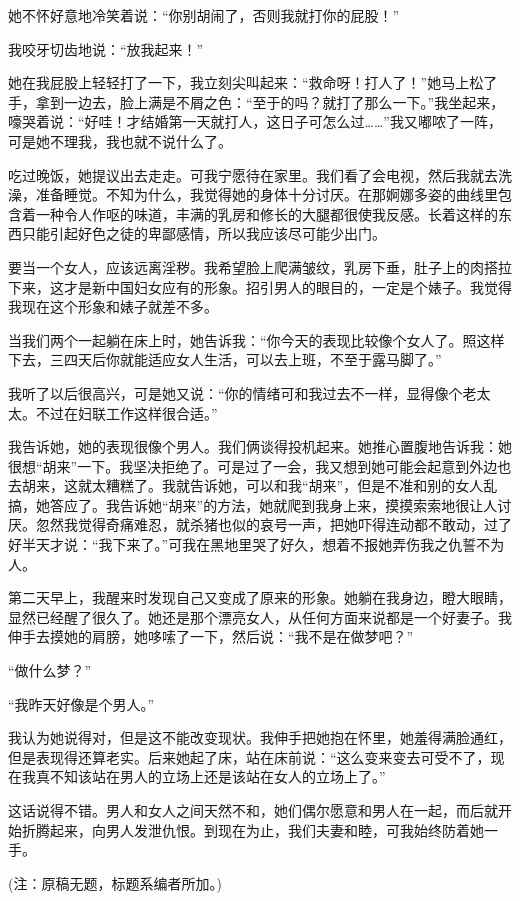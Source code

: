 她不怀好意地冷笑着说：“你别胡闹了，否则我就打你的屁股！” 

我咬牙切齿地说：“放我起来！” 

她在我屁股上轻轻打了一下，我立刻尖叫起来：“救命呀！打人了！”她马上松了手，拿到一边去，脸上满是不屑之色：“至于的吗？就打了那么一下。”我坐起来，嚎哭着说：“好哇！才结婚第一天就打人，这日子可怎么过……”我又嘟哝了一阵，可是她不理我，我也就不说什么了。 

吃过晚饭，她提议出去走走。可我宁愿待在家里。我们看了会电视，然后我就去洗澡，准备睡觉。不知为什么，我觉得她的身体十分讨厌。在那婀娜多姿的曲线里包含着一种令人作呕的味道，丰满的乳房和修长的大腿都很使我反感。长着这样的东西只能引起好色之徒的卑鄙感情，所以我应该尽可能少出门。 

要当一个女人，应该远离淫秽。我希望脸上爬满皱纹，乳房下垂，肚子上的肉搭拉下来，这才是新中国妇女应有的形象。招引男人的眼目的，一定是个婊子。我觉得我现在这个形象和婊子就差不多。 

当我们两个一起躺在床上时，她告诉我：“你今天的表现比较像个女人了。照这样下去，三四天后你就能适应女人生活，可以去上班，不至于露马脚了。” 

我听了以后很高兴，可是她又说：“你的情绪可和我过去不一样，显得像个老太太。不过在妇联工作这样很合适。” 

我告诉她，她的表现很像个男人。我们俩谈得投机起来。她推心置腹地告诉我：她很想“胡来”一下。我坚决拒绝了。可是过了一会，我又想到她可能会起意到外边也去胡来，这就太糟糕了。我就告诉她，可以和我“胡来”，但是不准和别的女人乱搞，她答应了。我告诉她“胡来”的方法，她就爬到我身上来，摸摸索索地很让人讨厌。忽然我觉得奇痛难忍，就杀猪也似的哀号一声，把她吓得连动都不敢动，过了好半天才说：“我下来了。”可我在黑地里哭了好久，想着不报她弄伤我之仇誓不为人。 

第二天早上，我醒来时发现自己又变成了原来的形象。她躺在我身边，瞪大眼睛，显然已经醒了很久了。她还是那个漂亮女人，从任何方面来说都是一个好妻子。我伸手去摸她的肩膀，她哆嗦了一下，然后说：“我不是在做梦吧？” 

“做什么梦？” 

“我昨天好像是个男人。” 

我认为她说得对，但是这不能改变现状。我伸手把她抱在怀里，她羞得满脸通红，但是表现得还算老实。后来她起了床，站在床前说：“这么变来变去可受不了，现在我真不知该站在男人的立场上还是该站在女人的立场上了。” 

这话说得不错。男人和女人之间天然不和，她们偶尔愿意和男人在一起，而后就开始折腾起来，向男人发泄仇恨。到现在为止，我们夫妻和睦，可我始终防着她一手。 

(注：原稿无题，标题系编者所加。)
